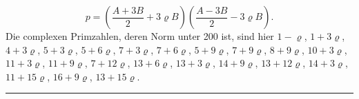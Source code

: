 \[
p = \left(\frac{A+3B}{2}+3\varrho B\right)\left(\frac{A-3B}{2}-3\varrho B\right)\!.
\]
Die complexen Primzahlen, deren Norm unter 200 ist, sind hier $1-\varrho$, $1+3\varrho$, $4+3\varrho$, $5+3\varrho$, $5+6\varrho$, $7+3\varrho$, $7+6\varrho$, $5+9\varrho$, $7+9\varrho$, $8+9\varrho$, $10+3\varrho$, $11+3\varrho$, $11+9\varrho$, $7+12\varrho$, $13+6\varrho$, $13+3\varrho$, $14+9\varrho$, $13+12\varrho$, $14+3\varrho$, $11+15\varrho$, $16+9\varrho$, $13+15\varrho$.

\begin{center}
\rule{3cm}{0.4pt}
\end{center}
